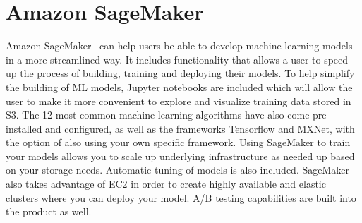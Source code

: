 \section{Amazon SageMaker}
Amazon SageMaker~\cite{hid-sp18-521-Sagemaker} can help users
be able to develop machine learning models in a more streamlined way. It
includes functionality that allows a user to speed up the process of
building, training and deploying their models. To help simplify the 
building of ML models, Jupyter notebooks are included which will allow 
the user to make it more convenient to explore and visualize training 
data stored in S3. The 12 most common machine learning algorithms have 
also come pre-installed and configured, as well as the frameworks Tensorflow
and MXNet, with the option of also using your own specific framework. 
Using SageMaker to train your models allows you to scale up underlying 
infrastructure as needed up based on your storage needs. Automatic tuning
of models is also included. SageMaker also takes advantage of EC2 in order
to create highly available and elastic clusters where you can deploy your
model. A/B testing capabilities are built into the product as well. 
